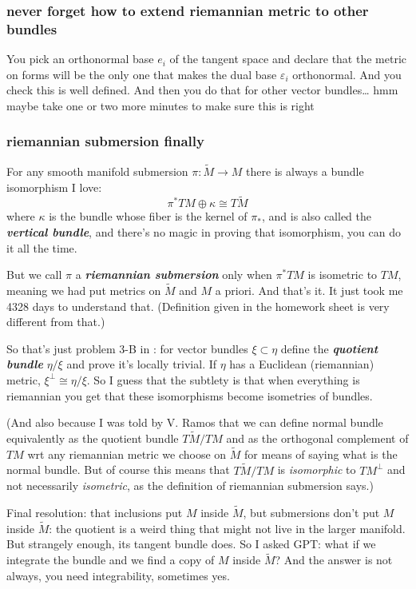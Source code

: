 \subsubsection{never forget how to extend riemannian metric to other bundles}

You pick an orthonormal base \(e_i\) of the tangent space and declare that the metric on forms will be the only one that makes the dual base \(\varepsilon_i\) orthonormal. And you check this is well defined. And then you do that for other vector bundles… hmm maybe take one or two more minutes to make sure this is right

\subsubsection{riemannian submersion finally}

For any smooth manifold submersion \(\pi:\widetilde{M}\to M\) there is always a bundle isomorphism I love:
\[\pi^*TM \oplus \kappa\cong T\widetilde{M}\]
where \(\kappa\) is the bundle whose fiber is the kernel of \(\pi_*\), and is also called the \textit{\textbf{vertical bundle}}, and there's no magic in proving that isomorphism, you can do it all the time.

 But we call \(\pi\) a \textit{\textbf{riemannian submersion}} only when \(\pi^*TM\) is isometric to \(TM\), meaning we had put metrics on \(\widetilde{M}\) and \(M\) a priori. And that's it. It just took me 4328 days to understand that. (Definition given in the homework sheet is very different from that.)

So that's just problem 3-B in \cite{mc}: for vector bundles \(\xi \subset \eta\) define the \textit{\textbf{quotient bundle}} \(\eta/\xi\) and prove it's locally trivial. If \(\eta\) has a Euclidean (riemannian) metric, \(\xi^\perp \cong \eta/\xi\). So I guess that the subtlety is that when everything is riemannian you get that these isomorphisms become isometries of bundles.

(And also because I was told by V. Ramos that we can define normal bundle equivalently as the quotient bundle \(T\widetilde{M}/TM\) and as the orthogonal complement of \(TM\) wrt any riemannian metric we choose on \(\widetilde{M}\) for means of saying what is the normal bundle. But of course this means that \(T\widetilde{M}/TM\) is \textit{isomorphic} to \(TM^\perp\) and not necessarily \textit{isometric}, as the definition of riemannian submersion says.)

Final resolution: that inclusions put \(M\) inside \(\widetilde{M}\), but submersions don't put \(M\) inside \(\widetilde{M}\): the quotient is a weird thing that might not live in the larger manifold. But strangely enough, its tangent bundle does. So I asked GPT: what if we integrate the bundle and we find a copy of \(M\) inside \(\widetilde{M}\)? And the answer is not always, you need integrability, sometimes yes.

